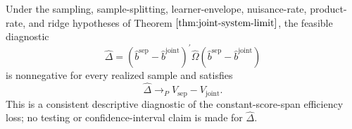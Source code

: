 Under the sampling, sample-splitting, learner-envelope, nuisance-rate, product-rate, and ridge hypotheses of Theorem \(\ref{thm:joint-system-limit}\), the feasible diagnostic
\[
\widehat\Delta=(\widehat b^{\mathrm{sep}}-\widehat b^{\mathrm{joint}})^{\prime}
\widehat\Omega
(\widehat b^{\mathrm{sep}}-\widehat b^{\mathrm{joint}})
\]
is nonnegative for every realized sample and satisfies
\[
\widehat\Delta\to_P V_{\mathrm{sep}}-V_{\mathrm{joint}}.
\]
This is a consistent descriptive diagnostic of the constant-score-span efficiency loss; no testing or confidence-interval claim is made for \(\widehat\Delta\).